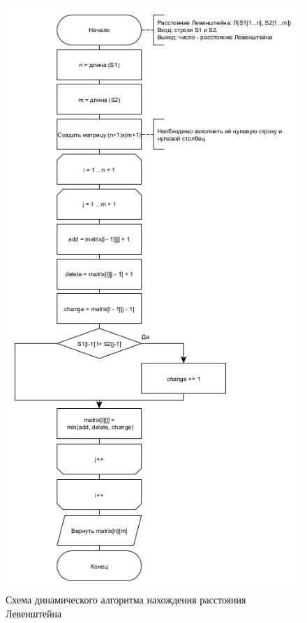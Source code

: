 \begin{figure}[h]
	\centering
	\includegraphics[scale=0.6]{img/levdyn.jpg}
	\caption{Схема динамического алгоритма нахождения расстояния Левенштейна}
	\label{fig:L_table}
\end{figure}

\clearpage

